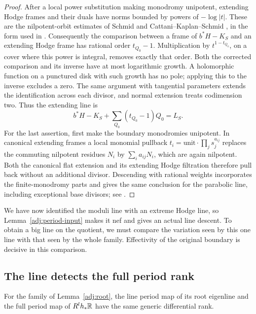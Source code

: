 \begin{proof}
After a local power substitution making monodromy unipotent, extending
Hodge frames and their duals have norms bounded by powers of
$-\log|t|$.  These are the nilpotent-orbit estimates of
Schmid and Cattani--Kaplan--Schmid \cite{Schmid,CKS}, in the form used in
\cite[Section~4.1]{LI}.  Consequently the comparison between a
frame of $b^*H-K_S$ and an extending Hodge frame has rational order
$t_{Q_0}-1$.  Multiplication by $t^{1-t_{Q_0}}$, on a cover where this
power is integral, removes exactly that order.  Both the corrected
comparison and its inverse have at most logarithmic growth.  A
holomorphic function on a punctured disk with such growth has no pole;
applying this to the inverse excludes a zero.  The same argument with
tangential parameters extends the identification across each divisor,
and normal extension treats codimension two.  Thus the extending line is
\[
              b^*H-K_S+\sum_{Q_0}(t_{Q_0}-1)Q_0=L_S.
\]
For the last assertion, first make the boundary monodromies
unipotent.  In canonical extending frames a local monomial pullback
$t_i=\text{unit}\cdot\prod_j s_j^{a_{ij}}$ replaces the commuting
nilpotent residues $N_i$ by $\sum_i a_{ij}N_i$, which are again
nilpotent.  Both the canonical flat extension and its extending Hodge
filtration therefore pull back without an additional divisor.
Descending with rational weights incorporates the finite-monodromy
parts and gives the same conclusion for the parabolic line, including
exceptional base divisors; see \cite[Section~4]{LI}.
\end{proof}

We have now identified the moduli line with an extreme Hodge line, so
Lemma~\ref{adj:period-input} makes it nef and gives an actual line
descent.  To obtain a big line on the quotient, we must compare the
variation seen by this one line with that seen by the whole family.
Effectivity of the original boundary is decisive in this comparison.

\subsection{The line detects the full period rank}

\begin{lemma}
\label{adj:rank}
For the family of Lemma~\ref{adj:root}, the line period map of its root
eigenline and the full period map of $R^lh_*\mathbb R$ have the same generic
differential rank.
\end{lemma}


